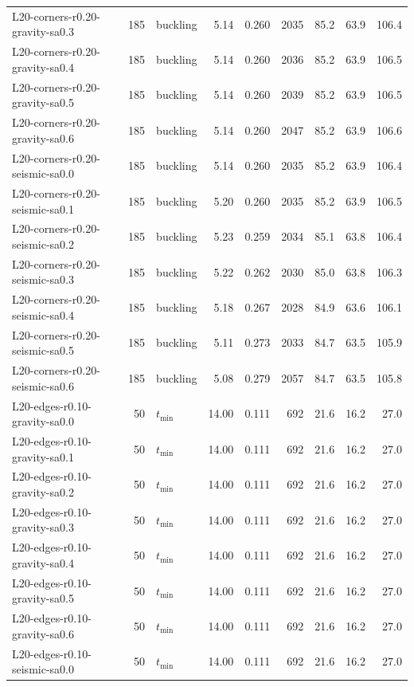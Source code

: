 \begin{tabular}{lrlrrrrrr}
L20-corners-r0.20-gravity-sa0.3 & 185 & buckling & 5.14 & 0.260 & 2035 & 85.2 & 63.9 & 106.4 \\
L20-corners-r0.20-gravity-sa0.4 & 185 & buckling & 5.14 & 0.260 & 2036 & 85.2 & 63.9 & 106.5 \\
L20-corners-r0.20-gravity-sa0.5 & 185 & buckling & 5.14 & 0.260 & 2039 & 85.2 & 63.9 & 106.5 \\
L20-corners-r0.20-gravity-sa0.6 & 185 & buckling & 5.14 & 0.260 & 2047 & 85.2 & 63.9 & 106.6 \\
L20-corners-r0.20-seismic-sa0.0 & 185 & buckling & 5.14 & 0.260 & 2035 & 85.2 & 63.9 & 106.4 \\
L20-corners-r0.20-seismic-sa0.1 & 185 & buckling & 5.20 & 0.260 & 2035 & 85.2 & 63.9 & 106.5 \\
L20-corners-r0.20-seismic-sa0.2 & 185 & buckling & 5.23 & 0.259 & 2034 & 85.1 & 63.8 & 106.4 \\
L20-corners-r0.20-seismic-sa0.3 & 185 & buckling & 5.22 & 0.262 & 2030 & 85.0 & 63.8 & 106.3 \\
L20-corners-r0.20-seismic-sa0.4 & 185 & buckling & 5.18 & 0.267 & 2028 & 84.9 & 63.6 & 106.1 \\
L20-corners-r0.20-seismic-sa0.5 & 185 & buckling & 5.11 & 0.273 & 2033 & 84.7 & 63.5 & 105.9 \\
L20-corners-r0.20-seismic-sa0.6 & 185 & buckling & 5.08 & 0.279 & 2057 & 84.7 & 63.5 & 105.8 \\
L20-edges-r0.10-gravity-sa0.0 & 50 & $t_{\mathrm{min}}$ & 14.00 & 0.111 & 692 & 21.6 & 16.2 & 27.0 \\
L20-edges-r0.10-gravity-sa0.1 & 50 & $t_{\mathrm{min}}$ & 14.00 & 0.111 & 692 & 21.6 & 16.2 & 27.0 \\
L20-edges-r0.10-gravity-sa0.2 & 50 & $t_{\mathrm{min}}$ & 14.00 & 0.111 & 692 & 21.6 & 16.2 & 27.0 \\
L20-edges-r0.10-gravity-sa0.3 & 50 & $t_{\mathrm{min}}$ & 14.00 & 0.111 & 692 & 21.6 & 16.2 & 27.0 \\
L20-edges-r0.10-gravity-sa0.4 & 50 & $t_{\mathrm{min}}$ & 14.00 & 0.111 & 692 & 21.6 & 16.2 & 27.0 \\
L20-edges-r0.10-gravity-sa0.5 & 50 & $t_{\mathrm{min}}$ & 14.00 & 0.111 & 692 & 21.6 & 16.2 & 27.0 \\
L20-edges-r0.10-gravity-sa0.6 & 50 & $t_{\mathrm{min}}$ & 14.00 & 0.111 & 692 & 21.6 & 16.2 & 27.0 \\
L20-edges-r0.10-seismic-sa0.0 & 50 & $t_{\mathrm{min}}$ & 14.00 & 0.111 & 692 & 21.6 & 16.2 & 27.0 \\

\end{tabular}

